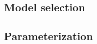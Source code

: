 \documentclass[11pt]{article}
\begin{document}
\subsection*{Model selection}

\subsection*{Parameterization}
%
%
%

{}

\end{document}
